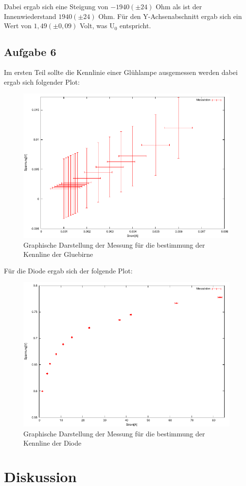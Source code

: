 \documentclass[12pt]{scrartcl}
\begin{document}
Dabei ergab sich eine Steigung von $-1940 (\pm 24)$ Ohm als ist der Innenwiederstand $1940 (\pm 24)$ Ohm.
Für den Y-Achsenabschnitt ergab sich ein Wert von $1,49	(\pm 0,09)$ Volt, was U$_0$ entspricht.

\newpage

\subsection{Aufgabe 6}
Im ersten Teil sollte die Kennlinie einer Glühlampe ausgemessen werden dabei ergab sich folgender Plot:

\begin{figure}[htbp] 
	 \centering
	   \includegraphics[scale = 1]{Gluebirne.pdf}
	 	\caption[Graphische Darstellung der Messung für die bestimmung der Kennline der Gluebirne]{Graphische Darstellung der Messung für die bestimmung der Kennline der Gluebirne}
	 \label{fig:aufgabe_6_a_plot}
\end{figure}

Für die Diode ergab sich der folgende Plot:

\begin{figure}[htbp] 
	 \centering
	   \includegraphics[scale = 1]{Diode.pdf}
	 	\caption[Graphische Darstellung der Messung für die bestimmung der Kennline der Diode]{Graphische Darstellung der Messung für die bestimmung der Kennline der Diode}
	 \label{fig:aufgabe_6_a_plot}
\end{figure}

\newpage

\section{Diskussion}


\end{document}
